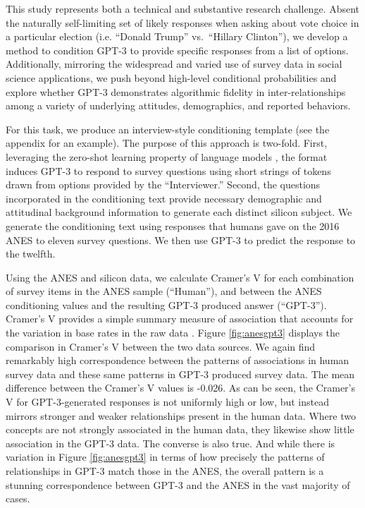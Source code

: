 \documentclass[11pt]{article}
\begin{document}
This study represents both a technical and substantive research challenge. Absent the naturally self-limiting set of likely responses when asking about vote choice in a particular election (i.e. ``Donald Trump'' vs.~``Hillary Clinton''), we develop a method to condition GPT-3 to provide specific responses from a list of options. Additionally, mirroring the widespread and varied use of survey data in social science applications, we push beyond high-level conditional probabilities and explore whether GPT-3 demonstrates algorithmic fidelity in inter-relationships among a variety of underlying attitudes, demographics, and reported behaviors.

For this task, we produce an interview-style conditioning template (see the appendix for an example). The purpose of this approach is two-fold. First, leveraging the zero-shot learning property of language models \citep{brown2020language}, the format induces GPT-3 to respond to survey questions using short strings of tokens drawn from options provided by the ``Interviewer.'' Second, the questions incorporated in the conditioning text provide necessary demographic and attitudinal background information to generate each distinct silicon subject. We generate the conditioning text using responses that humans gave on the 2016 ANES to eleven survey questions. We then use GPT-3 to predict the response to the twelfth.

Using the ANES and silicon data, we calculate Cramer's V for each combination of survey items in the ANES sample (``Human''), and between the ANES conditioning values and the resulting GPT-3 produced answer (``GPT-3''). Cramer's V provides a simple summary measure of association that accounts for the variation in base rates in the raw data \citep{Cramer1946}. Figure \ref{fig:anesgpt3} displays the comparison in Cramer's V between the two data sources.
We again find remarkably high correspondence between the patterns of associations in human survey data and these same patterns in GPT-3 produced survey data. The mean difference between the Cramer's V values is -0.026. As can be seen, the Cramer's V for GPT-3-generated responses is not uniformly high or low, but instead mirrors stronger and weaker relationships present in the human data. Where two concepts are not strongly associated in the human data, they likewise show little association in the GPT-3 data. The converse is also true. And while there is variation in Figure \ref{fig:anesgpt3} in terms of how precisely the patterns of relationships in GPT-3 match those in the ANES, the overall pattern is a stunning correspondence between GPT-3 and the ANES in the vast majority of cases. %
\end{document}
